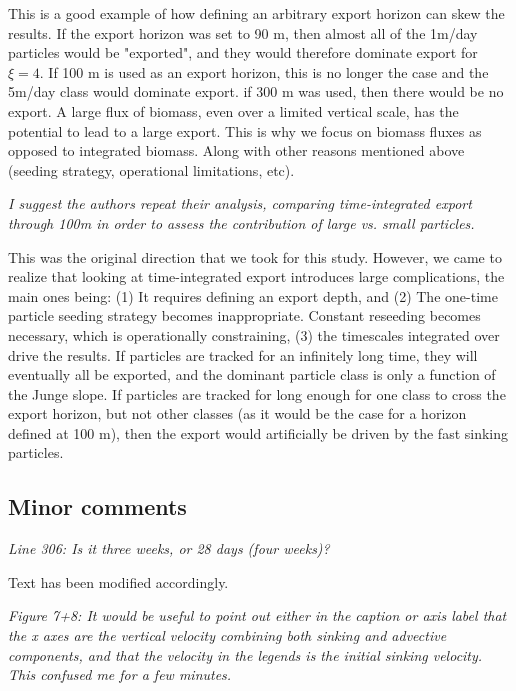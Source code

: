 \documentclass[12pt,letter]{article}
\begin{document}
{\color{blue}
	This is a good example of how defining an arbitrary export horizon can skew the results. If the export horizon was set to 90 m, then almost all of the 1m/day particles would be "exported", and they would therefore dominate export for $\xi=4$. If 100 m is used as an export horizon, this is no longer the case and the 5m/day class would dominate export. if 300 m was used, then there would be no export. A large flux of biomass, even over a limited vertical scale, has the potential to lead to a large export. This is why we focus on biomass fluxes as opposed to integrated biomass. Along with other reasons mentioned above (seeding strategy, operational limitations, etc).\\}

\textit{I suggest the authors repeat their analysis, comparing time-integrated export through 100m in order to assess the contribution of large vs. small particles.}

{\color{blue}
This was the original direction that we took for this study. However, we came to realize that looking at time-integrated export introduces large complications, the main ones being: (1) It requires defining an export depth, and (2) The one-time particle seeding strategy becomes inappropriate. Constant reseeding becomes necessary, which is operationally constraining, (3) the timescales integrated over drive the results. If particles are tracked for an infinitely long time, they will eventually all be exported, and the dominant particle class is only a function of the Junge slope. If particles are tracked for long enough for one class to cross the export horizon, but not other classes (as it would be the case for a horizon defined at 100 m), then the export would artificially be driven by the fast sinking particles.}

\subsection*{Minor comments}
\textit{Line 306: Is it three weeks, or 28 days (four weeks)?}

{\color{blue}Text has been modified accordingly.\\}

\textit{Figure 7+8: It would be useful to point out either in the caption or axis label that the x axes are the vertical velocity combining both sinking and advective components, and that the velocity in the legends is the initial sinking velocity. This confused me for a few minutes.}
\end{document}
